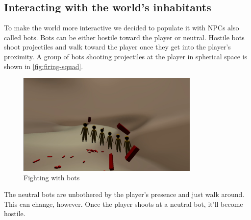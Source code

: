 \subsection{Interacting with the world's inhabitants}
To make the world more interactive we decided to populate it with NPCs also called bots.
Bots can be either hostile toward the player or neutral.
Hostile bots shoot projectiles and walk toward the player once they get into the player's proximity.
A group of bots shooting projectiles at the player in spherical space is shown in \autoref{fig:firing-squad}.
\begin{figure}[h]
    \centering
    \includegraphics[width=0.8\textwidth]{chapters/results/sections/gameplay/resources/firing-squad.png}
    \caption{Fighting with bots}
    \label{fig:firing-squad}
\end{figure}
The neutral bots are unbothered by the player's presence and just walk around.
This can change, however.
Once the player shoots at a neutral bot, it'll become hostile.
